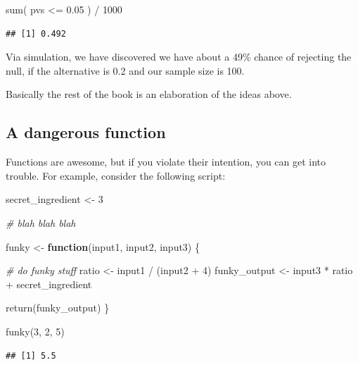 \documentclass[
]{book}
\newenvironment{Shaded}{\begin{snugshade}}{\end{snugshade}}
\newcommand{\CommentTok}[1]{\textcolor[rgb]{0.56,0.35,0.01}{\textit{#1}}}
\newcommand{\ControlFlowTok}[1]{\textcolor[rgb]{0.13,0.29,0.53}{\textbf{#1}}}
\newcommand{\DecValTok}[1]{\textcolor[rgb]{0.00,0.00,0.81}{#1}}
\newcommand{\FloatTok}[1]{\textcolor[rgb]{0.00,0.00,0.81}{#1}}
\newcommand{\FunctionTok}[1]{\textcolor[rgb]{0.00,0.00,0.00}{#1}}
\newcommand{\NormalTok}[1]{#1}
\newcommand{\OtherTok}[1]{\textcolor[rgb]{0.56,0.35,0.01}{#1}}
\newcommand{\SpecialCharTok}[1]{\textcolor[rgb]{0.00,0.00,0.00}{#1}}
\begin{document}
\begin{Shaded}
\begin{Highlighting}[]
\FunctionTok{sum}\NormalTok{( pvs }\SpecialCharTok{\textless{}=} \FloatTok{0.05}\NormalTok{ ) }\SpecialCharTok{/} \DecValTok{1000}
\end{Highlighting}
\end{Shaded}

\begin{verbatim}
## [1] 0.492
\end{verbatim}

Via simulation, we have discovered we have about a 49\% chance of rejecting the null, if the alternative is 0.2 and our sample size is 100.

Basically the rest of the book is an elaboration of the ideas above.

\hypertarget{a-dangerous-function}{%
\subsection{A dangerous function}\label{a-dangerous-function}}

Functions are awesome, but if you violate their intention, you can get into trouble.
For example, consider the following script:

\begin{Shaded}
\begin{Highlighting}[]
\NormalTok{secret\_ingredient }\OtherTok{\textless{}{-}} \DecValTok{3}

\CommentTok{\# blah blah blah}

\NormalTok{funky }\OtherTok{\textless{}{-}} \ControlFlowTok{function}\NormalTok{(input1, input2, input3) \{}
  
  \CommentTok{\# do funky stuff}
\NormalTok{  ratio }\OtherTok{\textless{}{-}}\NormalTok{ input1 }\SpecialCharTok{/}\NormalTok{ (input2 }\SpecialCharTok{+} \DecValTok{4}\NormalTok{)}
\NormalTok{  funky\_output }\OtherTok{\textless{}{-}}\NormalTok{ input3 }\SpecialCharTok{*}\NormalTok{ ratio }\SpecialCharTok{+}\NormalTok{ secret\_ingredient}
  
  \FunctionTok{return}\NormalTok{(funky\_output)  }
\NormalTok{\}}

\FunctionTok{funky}\NormalTok{(}\DecValTok{3}\NormalTok{, }\DecValTok{2}\NormalTok{, }\DecValTok{5}\NormalTok{)}
\end{Highlighting}
\end{Shaded}

\begin{verbatim}
## [1] 5.5
\end{verbatim}
\end{document}
